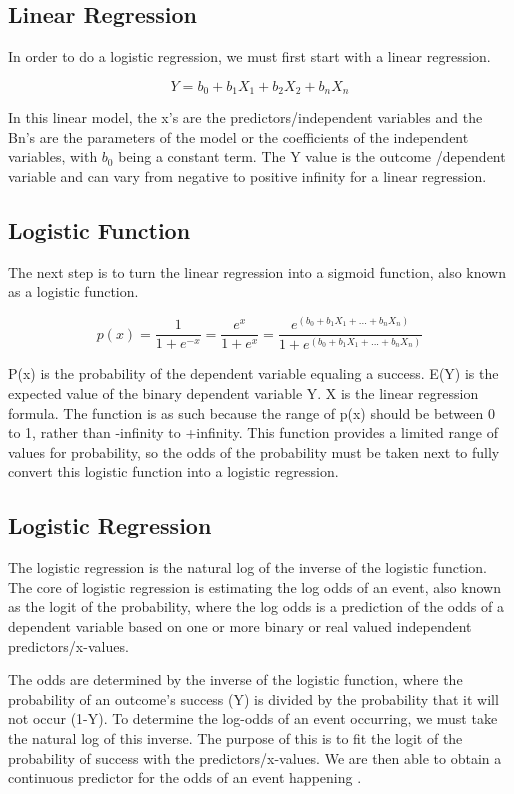 \documentclass[letterpaper, 10 pt, conference]{ieeeconf}  %
\begin{document}
\subsection{Linear Regression}
In order to do a logistic regression, we must first start with a linear regression.

$$Y = b_0 + b_1X_1 + b_2X_2 + b_nX_n$$

In this linear model, the x’s are the predictors/independent variables and the Bn’s are the parameters of the model or the coefficients of the independent variables, with $b_0$ being a constant term. The Y value is the outcome /dependent variable and can vary from negative to positive infinity for a linear regression. 

\subsection{Logistic Function}
The next step is to turn the linear regression into a sigmoid function, also known as a logistic function. 

$$p(x) =  \frac{1}{1+e^{-x}}   =   \frac{e^x}{1+e^x} 
= \frac{e^{(b_0 + b_1X_1 + ... + b_nX_n)}}{1+e^{(b_0 + b_1X_1 + ... + b_nX_n)}}$$

P(x) is the probability of the dependent variable equaling a success. E(Y) is the expected value of the binary dependent variable Y. X is the linear regression formula. The function is as such because the range of p(x) should be between 0 to 1, rather than -infinity to +infinity. This function provides a limited range of values for probability, so the odds of the probability must be taken next to fully convert this logistic function into a logistic regression. 

\subsection{Logistic Regression} 
The logistic regression is the natural log of the inverse of the logistic function. The core of logistic regression is estimating the log odds of an event, also known as the logit of the probability, where the log odds is a prediction of the odds of a dependent variable based on one or more binary or real valued independent predictors/x-values.

The odds are determined by the inverse of the logistic function, where the probability of an outcome’s success (Y) is divided by the probability that it will not occur (1-Y). To determine the log-odds of an event occurring, we must take the natural log of this inverse. The purpose of this is to fit the logit of the probability of success with the predictors/x-values. We are then able to obtain a continuous predictor for the odds of an event happening \cite{c6}.
\end{document}
